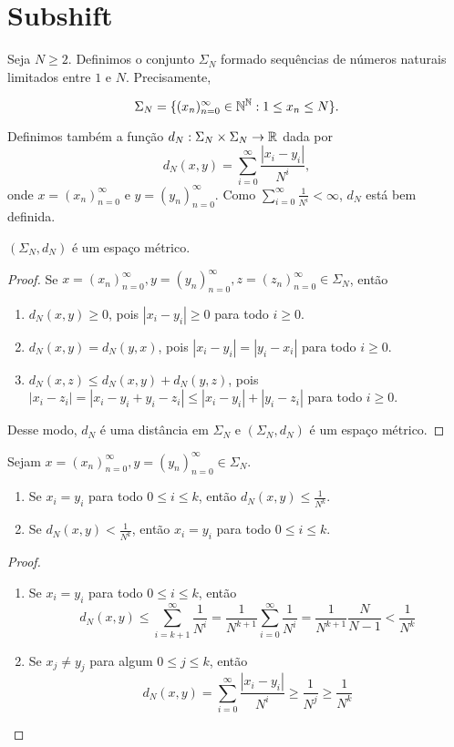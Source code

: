 \section{Subshift}

Seja $N \geq 2$. Definimos o conjunto $\Sigma_N$ formado sequências de números naturais limitados entre $1$ e $N$. Precisamente,

$$\Sigma_N = \{ (x_n)_{n=0}^{\infty} \in \mathbb{N}^{\mathbb{N}} : 1 \leq x_n \leq N \}.$$

Definimos também a função $d_N : \Sigma_N \times \Sigma_N \to \mathbb{R}$ dada por
$$d_N(x, y) = \sum_{i=0}^\infty \frac{|x_i - y_i|}{N^i},$$
onde $x = (x_n)_{n=0}^{\infty}$ e $y = (y_n)_{n=0}^{\infty}$. Como $\sum_{i=0}^\infty \frac{1}{N^i} < \infty$, $d_N$ está bem definida.


\begin{proposition}
$(\Sigma_N, d_N)$ é um espaço métrico.
\end{proposition}


\begin{proof}
Se $x = (x_n)_{n=0}^{\infty}, y = (y_n)_{n=0}^{\infty}, z = (z_n)_{n=0}^{\infty} \in \Sigma_N$, então
\begin{enumerate}
\item $d_N(x, y) \geq 0$, pois $|x_i - y_i| \geq 0$ para todo $i \geq 0$.
\item $d_N(x, y) = d_N(y, x)$, pois $|x_i - y_i| = |y_i - x_i|$ para todo $i \geq 0$.
\item $d_N(x, z) \leq d_N(x, y) + d_N(y, z)$, pois $|x_i - z_i| = |x_i - y_i + y_i - z_i| \leq |x_i - y_i| + |y_i - z_i|$ para todo $i \geq 0$.
\end{enumerate}
Desse modo, $d_N$ é uma distância em $\Sigma_N$ e $(\Sigma_N, d_N)$ é um espaço métrico.
\end{proof}


\begin{proposition}
Sejam $x = (x_n)_{n=0}^{\infty}, y = (y_n)_{n=0}^{\infty} \in \Sigma_N$.
\begin{enumerate}
\item Se $x_i = y_i$ para todo $0 \leq i \leq k$, então $d_N(x, y) \leq \frac{1}{N^k}$.
\item Se $d_N(x, y) < \frac{1}{N^k}$, então $x_i = y_i$ para todo $0 \leq i \leq k$.
\end{enumerate}
\end{proposition}


\begin{proof}
\begin{enumerate}
\item Se $x_i = y_i$ para todo $0 \leq i \leq k$, então
$$d_N(x, y) \leq \sum_{i=k+1}^\infty \frac{1}{N^i} = \frac{1}{N^{k+1}}\sum_{i=0}^\infty \frac{1}{N^{i}} = \frac{1}{N^{k+1}} \frac{N}{N - 1} < \frac{1}{N^k}$$

\item Se $x_j \neq y_j$ para algum $0 \leq j \leq k$, então
$$d_N(x, y) = \sum_{i=0}^\infty \frac{|x_i - y_i|}{N^i} \geq \frac{1}{N^j} \geq \frac{1}{N^k}$$
\end{enumerate}
\end{proof}


